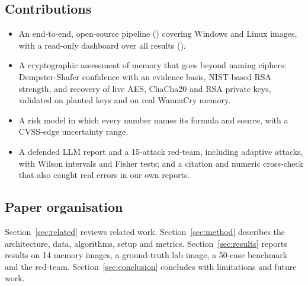\subsection{Contributions}
\begin{itemize}
  \item An end-to-end, open-source pipeline (\repo) covering Windows and Linux images, with a read-only
        dashboard over all results (\demo).
  \item A cryptographic assessment of memory that goes beyond naming ciphers: Dempster-Shafer confidence with
        an evidence basis, NIST-based RSA strength, and recovery of live AES, ChaCha20 and RSA private keys,
        validated on planted keys and on real WannaCry memory.
  \item A risk model in which every number names its formula and source, with a CVSS-edge uncertainty range.
  \item A defended LLM report and a 15-attack red-team, including adaptive attacks, with Wilson intervals and
        Fisher tests; and a citation and numeric cross-check that also caught real errors in our own
        reports.
\end{itemize}

\subsection{Paper organisation}
Section~\ref{sec:related} reviews related work. Section~\ref{sec:method} describes the architecture, data,
algorithms, setup and metrics. Section~\ref{sec:results} reports results on 14 memory images, a ground-truth
lab image, a 50-case benchmark and the red-team. Section~\ref{sec:conclusion} concludes with limitations and
future work.
